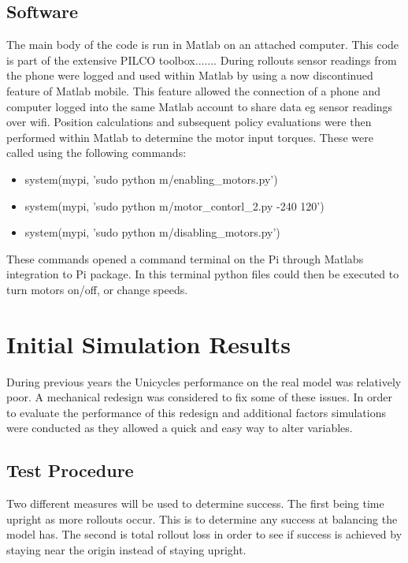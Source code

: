\documentclass[twoside,twocolumn,12pt]{article}
\begin{document}
\subsection{Software}
The main body of the code is run in Matlab on an attached computer. This code is part of the extensive PILCO toolbox.......
\newline
During rollouts sensor readings from the phone were logged and used within Matlab by using a now discontinued feature of Matlab mobile. This feature allowed the connection of a phone and computer logged into the same Matlab account to share data eg sensor readings over wifi.
\newline
Position calculations and subsequent policy evaluations were then performed within Matlab to determine the motor input torques. These were called using the following commands:
\begin{itemize}
\item system(mypi, 'sudo python m/enabling\_motors.py')
\item system(mypi, 'sudo python m/motor\_contorl\_2.py -240 120')
\item system(mypi, 'sudo python m/disabling\_motors.py')
\end{itemize}
These commands opened a command terminal on the Pi through Matlabs integration to Pi package. In this terminal python files could then be executed to turn motors on/off, or change speeds.

\clearpage
\section{Initial Simulation Results}

During previous years the Unicycles performance on the real model was relatively poor. A mechanical redesign was considered to fix some of these issues. In order to evaluate the performance of this redesign and additional factors simulations were conducted as they allowed a quick and easy way to alter variables.
\newline

\subsection{Test Procedure}

Two different measures will be used to determine success. The first being time upright as more rollouts occur. This is to determine any success at balancing the model has. The second is total rollout loss in order to see if success is achieved by staying near the origin instead of staying upright.
\end{document}
